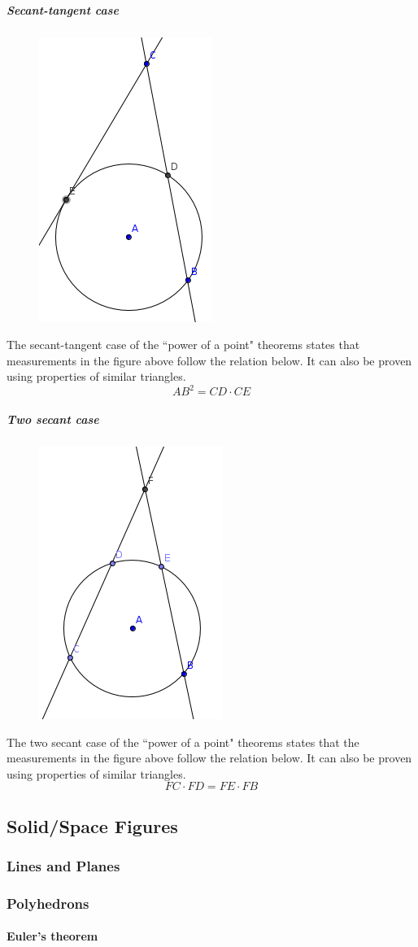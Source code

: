 \subparagraph{Secant-tangent case}
\begin{figure}[h!]
    \centering
    \includegraphics[scale=0.5]{assets/images/secant-tangent.png}
\end{figure}
The secant-tangent case of the ``power of a point" theorems states that measurements in the figure above follow the relation below.
It can also be proven using properties of similar triangles.
$$AB^2 = CD \cdot CE$$

\subparagraph{Two secant case}
\begin{figure}[h!]
    \centering
    \includegraphics[scale=0.5]{assets/images/twosecant.png}
\end{figure}
The two secant case of the ``power of a point" theorems states that the measurements in the figure above follow the relation below.
It can also be proven using properties of similar triangles.
$$FC \cdot FD = FE \cdot FB$$

\subsection{Solid/Space Figures}

\subsubsection{Lines and Planes}

\subsubsection{Polyhedrons}
\paragraph{Euler's theorem}
